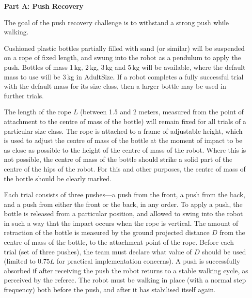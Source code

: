 \clearpage
\sffamily
{\bfseries\color[rgb]{0.4,0.4,0.4}
Part A: Push Recovery }
{}


\bigskip

The goal of the push recovery challenge is to withstand a strong push while walking. 

Cushioned plastic bottles partially filled with sand (or similar) will be suspended on a rope of fixed length, and swung into the robot as a pendulum to apply the push. Bottles of mass 1$\,$kg, 2$\,$kg, 3$\,$kg and 5$\,$kg will be available, where the default mass to use  will be  3$\,$kg in AdultSize. If a robot completes a fully successful trial with the default mass for its size class, then a larger bottle may be used in further trials.

\medskip
The length of the rope $L$ (between 1.5 and 2 meters, measured from the point of 
attachment to the centre of mass of the bottle) will remain fixed for all trials 
of a particular size class.
The rope is attached to a frame of adjustable height,
which is used to adjust the centre of mass of the bottle at the moment of impact
to be as close as possible to the height of the centre of mass of the robot.
Where this is not possible, the centre of mass of the bottle should strike a solid part
of the centre of the hips of the robot.
For this and other purposes, the centre of mass of the bottle should be clearly marked.

\medskip
Each trial consists of three pushes---a push from the front, a push from the back, and a push from either the front or the back, in any order. To apply a push, the bottle is released from a particular position, and allowed to swing into the robot in such a way that the impact occurs when the rope is vertical. The amount of retraction of the bottle is measured by the ground projected distance $D$ from the centre of mass of the bottle, to the attachment point of the rope. Before each trial (set of three pushes), the team must declare what value of $D$ should be used (limited to $0.75L$ for practical implementation concerns). A push is successfully absorbed if after receiving the push the robot 
returns to a stable walking cycle, as perceived by the referee. The robot must be walking in place (with a normal step frequency) both before the push, and after it has stabilised itself again.

